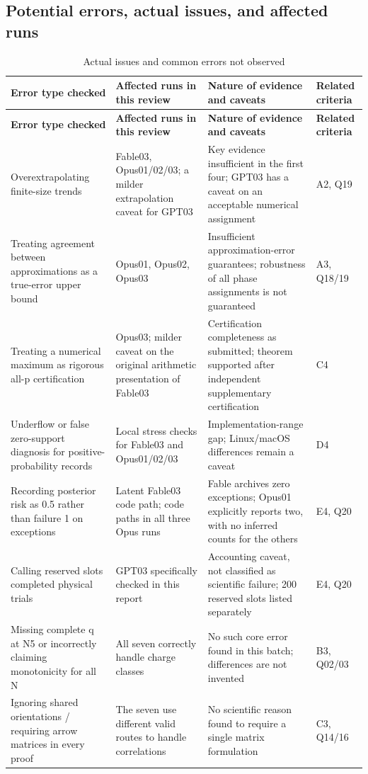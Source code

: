 \documentclass[11pt,a4paper]{article}
\begin{document}
\subsection{Potential errors,\allowbreak{} actual issues,\allowbreak{} and affected runs}
{\fontsize{9.0}{12.6}\selectfont
\setlength{\tabcolsep}{2.5pt}
\begin{longtable}{>{\raggedright\arraybackslash}p{}>{\raggedright\arraybackslash}p{}>{\raggedright\arraybackslash}p{}>{\raggedright\arraybackslash}p{}}
\caption{Actual issues and common errors not observed}\\
\toprule
\textbf{Error type checked} & \textbf{Affected runs in this review} & \textbf{Nature of evidence and caveats} & \textbf{Related criteria}\tabularnewline
\midrule
\endfirsthead
\toprule
\textbf{Error type checked} & \textbf{Affected runs in this review} & \textbf{Nature of evidence and caveats} & \textbf{Related criteria}\tabularnewline
\midrule
\endhead
{}Overextrapolating finite-size trends & Fable03,\allowbreak{} Opus01/\allowbreak{}02/\allowbreak{}03; a milder extrapolation caveat for GPT03 & Key evidence insufficient in the first four; GPT03 has a caveat on an acceptable numerical assignment & A2,\allowbreak{} Q19\tabularnewline
{}Treating agreement between approximations as a true-error upper bound & Opus01,\allowbreak{} Opus02,\allowbreak{} Opus03 & Insufficient approximation-error guarantees; robustness of all phase assignments is not guaranteed & A3,\allowbreak{} Q18/\allowbreak{}19\tabularnewline
{}Treating a numerical maximum as rigorous all-p certification & Opus03; milder caveat on the original arithmetic presentation of Fable03 & Certification completeness as submitted; theorem supported after independent supplementary certification & C4\tabularnewline
{}Underflow or false zero-support diagnosis for positive-probability records & Local stress checks for Fable03 and Opus01/\allowbreak{}02/\allowbreak{}03 & Implementation-range gap; Linux/\allowbreak{}macOS differences remain a caveat & D4\tabularnewline
{}Recording posterior risk as 0.5 rather than failure 1 on exceptions & Latent Fable03 code path; code paths in all three Opus runs & Fable archives zero exceptions; Opus01 explicitly reports two,\allowbreak{} with no inferred counts for the others & E4,\allowbreak{} Q20\tabularnewline
{}Calling reserved slots completed physical trials & GPT03 specifically checked in this report & Accounting caveat,\allowbreak{} not classified as scientific failure; 200 reserved slots listed separately & E4,\allowbreak{} Q20\tabularnewline
{}Missing complete q at N5 or incorrectly claiming monotonicity for all N & All seven correctly handle charge classes & No such core error found in this batch; differences are not invented & B3,\allowbreak{} Q02/\allowbreak{}03\tabularnewline
{}Ignoring shared orientations /\allowbreak{} requiring arrow matrices in every proof & The seven use different valid routes to handle correlations & No scientific reason found to require a single matrix formulation & C3,\allowbreak{} Q14/\allowbreak{}16\tabularnewline
\bottomrule
\end{longtable}
}
\end{document}
